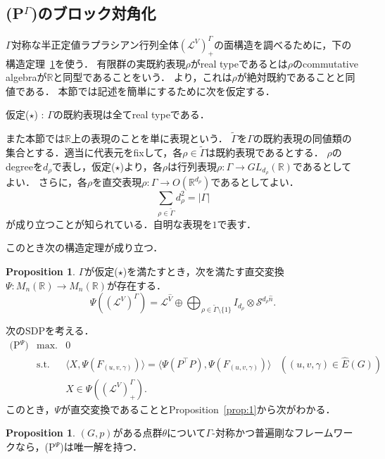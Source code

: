 \documentclass[11pt]{article}
\theoremstyle{definition}
\newtheorem{prop}[defi]{Proposition}
\begin{document}
\subsection{(P$^\Gamma$)のブロック対角化}
    $\Gamma$対称な半正定値ラプラシアン行列全体$(\mathcal{L}^V)^\Gamma_+$の面構造を調べるために，下の構造定理~\ref{prop:str}を使う．
    有限群の実既約表現$\rho$がreal typeであるとは$\rho$のcommutative algebraが$\mathbb{R}$と同型であることをいう．
    \cite[Chapter 13.2]{serre1977linear}より，これは$\rho$が絶対既約であることと同値である．
    本節では記述を簡単にするために次を仮定する．
    \begin{center}
    仮定($\star$) : $\Gamma$の既約表現は全てreal typeである．
    \end{center}
    また本節では$\mathbb{R}$上の表現のことを単に表現という．
    $\tilde{\Gamma}$を$\Gamma$の既約表現の同値類の集合とする．適当に代表元をfixして，各$\rho \in \tilde{\Gamma}$は既約表現であるとする．
    $\rho$のdegreeを$d_\rho$で表し，仮定($\star$)より，各$\rho$は行列表現$\rho:\Gamma \rightarrow GL_{d_\rho}(\mathbb{R})$であるとしてよい．
    さらに，各$\rho$を直交表現$\rho:\Gamma \rightarrow O(\mathbb{R}^{d_\rho})$であるとしてよい．
    \begin{equation} \label{eq:d1}
        \sum_{\rho \in \tilde{\Gamma}} d_\rho^2 = |\Gamma|
    \end{equation}
    が成り立つことが知られている．自明な表現を$1$で表す．
    
    このとき次の構造定理が成り立つ．
    \begin{prop} \label{prop:str}
        $\Gamma$が仮定($\star$)を満たすとき，次を満たす直交変換$\Psi:M_n(\mathbb{R}) \rightarrow M_n(\mathbb{R})$が存在する．
        \[
        \Psi((\mathcal{L}^V)^\Gamma)= \mathcal{L}^{\hat{V}} \oplus \bigoplus_{\rho \in \tilde{\Gamma} \setminus \{1\}} I_{d_\rho}\otimes \mathcal{S}^{d_\rho \hat{n}}.
        \]
    \end{prop}
    
    次のSDPを考える．
    \[
        \begin{array}{llll}
        \text{(P$^\Psi$)} &  \text{max.}  & 0 \\
                & \text{s.t.}  & \langle X, \Psi(F_{(u,v,\gamma)}) \rangle   =  \langle \Psi(P^\top P), \Psi(F_{(u,v,\gamma)}) \rangle &((u,v,\gamma) \in \hat{E}(G)) \\
                &              & X \in \Psi((\mathcal{L}^V)^\Gamma_+).
        \end{array}
    \]
    このとき，$\Psi$が直交変換であることとProposition~\ref{prop:1}から次がわかる．
    \begin{prop} \label{prop:2}
        $(G,p)$がある点群$\theta$について$\Gamma$-対称かつ普遍剛なフレームワークなら，(P$^\Psi$)は唯一解を持つ．
    \end{prop}
    
\end{document}
